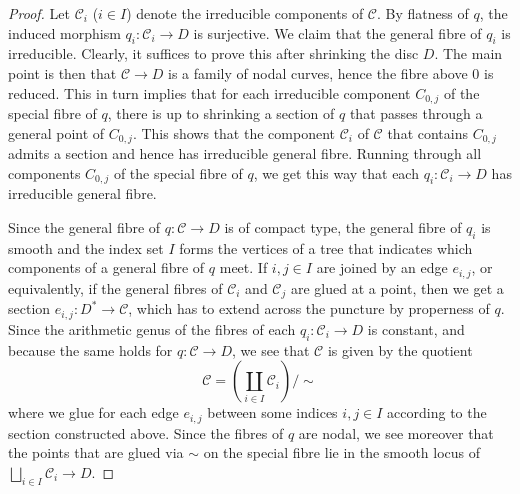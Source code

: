 \documentclass[a4paper,11pt,reqno]{amsart}
\numberwithin{equation}{section}
\theoremstyle{plain}
\theoremstyle{definition}
\newcommand{\ca}[1]{{\mathcal{#1}}}
\newcommand{\p}[1]{\left(#1\right)}
\begin{document}
\begin{proof}
Let $\mathcal C_i$ ($i\in I$) denote the irreducible components of $\ca C$. 
By flatness of $q$, the induced morphism $q_i \colon \ca C_i \to D$ is surjective.
We claim that the general fibre  of $q_i$ is irreducible.
Clearly, it suffices to prove this after shrinking the disc $D$.
The main point is then that $\mathcal C\to D$ is a family of nodal curves, hence the fibre above $0$ is reduced.
This in turn implies that for each irreducible component $C_{0,j}$ of the special fibre of $q$, there is up to shrinking a section of $q$ that passes through a general point of $C_{0,j}$.
This shows that the component $\mathcal C_i$ of $\mathcal C$ that contains $C_{0,j}$ admits a section and hence has irreducible general fibre.
Running through all components $C_{0,j}$ of the special fibre of $q$, we get this way that each $q_i \colon \ca C_i \to D$ has irreducible general fibre.

Since the general fibre of $q\colon\mathcal C\to D$ is of compact type, the general fibre of $q_i$ is smooth and the index set $I$ forms the vertices of a tree that indicates which components of a general fibre of $q$ meet. If $i,j\in I$ are joined by an edge $e_{i,j}$, or equivalently, if the general fibres of $\mathcal C_i$ and $\mathcal C_j$ are glued at a point, then we get a section $e_{i,j}:D^*\to\mathcal C$, which has to extend across the puncture by properness of $q$.
Since the arithmetic genus of the fibres of each $q_i\colon \mathcal C_i\to D$ is constant, and because the same holds for $q\colon \mathcal C\to D$, we see that $\mathcal C$ is given by the quotient 
$$
\mathcal C=\p{\coprod_{i\in I} \mathcal C_i}/\sim
$$
where we glue for each edge $e_{i,j}$ between some indices $i,j\in I$ according to the section constructed above.
Since the fibres of $q$ are nodal, we see moreover that the points that are glued via $\sim$ on the special fibre lie in the smooth locus of $\bigsqcup_{i\in I} \mathcal C_i\to D$.


\end{proof}
\end{document}
